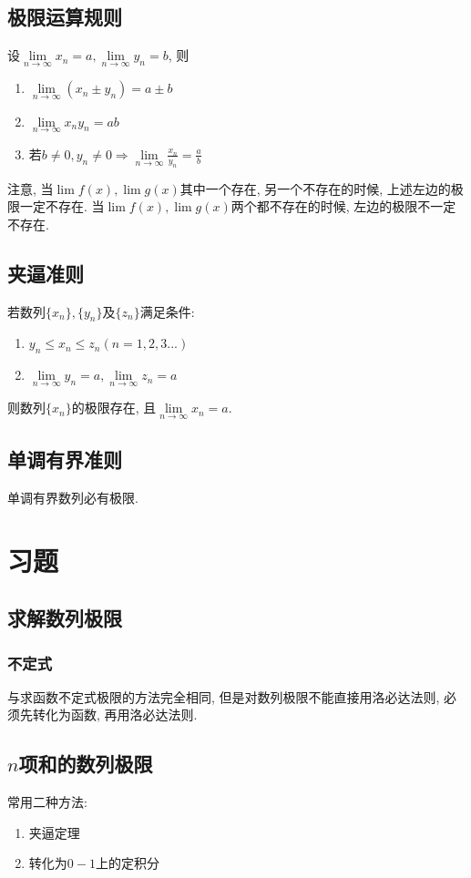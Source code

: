 \subsection{极限运算规则}
设$ \lim\limits_{n\rightarrow \infty}x_{n}=a, \lim\limits_{n\rightarrow \infty}y_{n}=b $, 则
\begin{enumerate}
\item $ \lim\limits_{n\rightarrow \infty}(x_{n}\pm y_{n})=a\pm b $
\item $ \lim\limits_{n\rightarrow \infty}x_{n}y_{n}=ab $
\item 若$ b\neq 0, y_{n}\neq 0 \Rightarrow \lim\limits_{n\rightarrow \infty}\frac{x_{n}}{y_{n}}=\frac{a}{b}$
\end{enumerate}\par
注意, 当$ \lim\limits f(x), \lim\limits g(x) $其中一个存在, 另一个不存在的时候, 上述左边的极限一定不存在. 当$ \lim\limits f(x), \lim\limits g(x) $两个都不存在的时候, 左边的极限不一定不存在.
\subsection{夹逼准则}
若数列$ \{x_{n}\}, \{y_{n}\} $及$ \{z_{n}\} $满足条件:
\begin{enumerate}
\item $ y_{n}\le x_{n}\le z_{n}(n=1,2,3...) $
\item $ \lim\limits_{n\rightarrow \infty}y_{n}=a, \lim\limits_{n\rightarrow \infty}z_{n}=a $
\end{enumerate}\par
则数列$ \{x_{n}\} $的极限存在, 且$ \lim\limits_{n\rightarrow \infty}x_{n}=a $.
\subsection{单调有界准则}
单调有界数列必有极限.
\section{习题}
\subsection{求解数列极限}
\subsubsection{不定式}
与求函数不定式极限的方法完全相同, 但是对数列极限不能直接用洛必达法则, 必须先转化为函数, 再用洛必达法则.
\subsection{$ n $项和的数列极限}
常用二种方法:
\begin{enumerate}
\item 夹逼定理
\item 转化为$ 0-1 $上的定积分
\end{enumerate}

